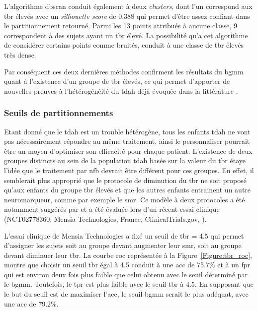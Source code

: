 L'algorithme \gls{dbscan} conduit également à deux \textit{clusters}, dont l'un correspond aux \gls{tbr} élevés avec un \textit{silhouette score} de 0.388 
qui permet d'être assez confiant dans le partitionnement retourné. Parmi les 13 points attribués à 
aucune classe, 9 correspondent à des sujets ayant un \gls{tbr} élevé. La possibilité qu'a cet algorithme de considérer certains points comme bruités, conduit à
une classe de \gls{tbr} élevés très dense. 

Par conséquent ces deux dernières méthodes confirment les résultats du \gls{bgmm} quant à l'existence d'un groupe de \gls{tbr} élevés, ce qui permet 
d'apporter de nouvelles preuves à l'hétérogénéité du \gls{tdah} déjà évoquée dans la littérature \citep{Arns2008, Arns2012, Barry2003, Clarke2011, 
Liechti2013, Loo2013, Loo2018}.

\subsubsection{Seuils de partitionnements}

Etant donné que le \gls{tdah} est un trouble hétérogène, tous les enfants \gls{tdah} ne vont pas nécessairement répondre au même traitement, ainsi le personnaliser 
pourrait être un moyen d'optimiser son efficacité pour chaque patient. L'existence de deux groupes distincts au sein de la 
population \gls{tdah} basée sur la valeur du \gls{tbr} étaye l'idée que le traitement par \gls{nfb} devrait être différent pour ces groupes. En effet, il semblerait
plus approprié que le protocole de diminution du \gls{tbr} ne soit proposé qu'aux enfants du groupe \gls{tbr} élevés et que les autres enfants entrainent un autre
neuromarqueur, comme par exemple le \gls{smr}. Ce modèle à deux protocoles a été notamment suggérés par \citet{Kerson2013, Arns2012} et a été évaluée lors 
d'un récent essai clinique (NCT02778360, Mensia Technologies, France, ClinicalTrials.gov, \citet{Bioulac2019}).

L'essai clinique de Mensia Technologies a fixé un seuil de \gls{tbr} = 4.5 qui permet d'assigner les sujets soit au groupe devant augmenter leur \gls{smr}, soit 
au groupe devant diminuer leur \gls{tbr}. La courbe \gls{roc} représentée à la Figure~\ref{Figure:tbr_roc}, montre que choisir un seuil \gls{tbr} égal à 4.5 conduit
à une \gls{acc} de 75.7\% et à un \gls{fpr} qui est environ deux fois plus faible que celui obtenu avec le seuil déterminé par le \gls{bgmm}. Toutefois, 
le \gls{tpr} est plus faible avec le seuil \gls{tbr} à 4.5. En supposant que le but du seuil est de maximiser l'\gls{acc}, le seuil \gls{bgmm} serait le 
plus adéquat, avec une \gls{acc} de 79.2\%.

